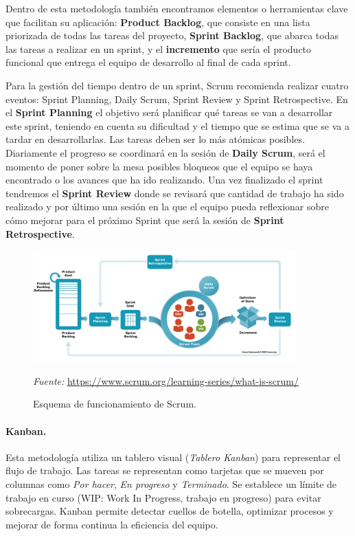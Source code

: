 Dentro de esta metodología también encontramos elementos o herramientas clave que facilitan su aplicación: \textbf{Product Backlog}, que consiste en una lista priorizada de todas las tareas del proyecto, \textbf{Sprint Backlog}, que abarca todas las tareas a realizar en un sprint, y el \textbf{incremento} que sería el producto funcional que entrega el equipo de desarrollo al final de cada sprint.

Para la gestión del tiempo dentro de un sprint, Scrum recomienda realizar cuatro eventos: Sprint Planning, Daily Scrum, Sprint Review y Sprint Retrospective. En el \textbf{Sprint Planning} el objetivo será planificar qué tareas se van a desarrollar este sprint, teniendo en cuenta su dificultad y el tiempo que se estima que se va a tardar en desarrollarlas. Las tareas deben ser lo más atómicas posibles. Diariamente el progreso se coordinará en la sesión de \textbf{Daily Scrum}, será el momento de poner sobre la mesa posibles bloqueos que el equipo se haya encontrado o los avances que ha ido realizando. Una vez finalizado el sprint tendremos el \textbf{Sprint Review} donde se revisará que cantidad de trabajo ha sido realizado y por último una sesión en la que el equipo pueda reflexionar sobre cómo mejorar para el próximo Sprint que será la sesión de \textbf{Sprint Retrospective}.

\begin{figure}[H]
\centering
\includegraphics[width=0.9\textwidth]{./img/methodologies/scrum.png}
\caption{Esquema de funcionamiento de Scrum.}
\label{fig:scrum}
\vspace{0.2em}
{\footnotesize \centering \textit{Fuente:} \url{https://www.scrum.org/learning-series/what-is-scrum/} \par}
\end{figure}

\paragraph{Kanban.} Esta metodología utiliza un tablero visual (\textit{Tablero Kanban}) para representar el flujo de trabajo. Las tareas se representan como tarjetas que se mueven por columnas como \textit{Por hacer}, \textit{En progreso} y \textit{Terminado}. Se establece un límite de trabajo en curso (WIP: Work In Progress, trabajo en progreso) para evitar sobrecargas. Kanban permite detectar cuellos de botella, optimizar procesos y mejorar de forma continua la eficiencia del equipo.


